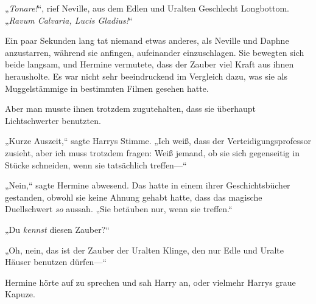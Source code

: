 „\emph{Tonare!}“, rief Neville, aus dem Edlen und Uralten Geschlecht Longbottom. „\emph{Ravum Calvaria, Lucis Gladius!}“

\later

Ein paar Sekunden lang tat niemand etwas anderes, als Neville und Daphne anzustarren, während sie anfingen, aufeinander einzuschlagen. Sie bewegten sich beide langsam, und Hermine vermutete, dass der Zauber viel Kraft aus ihnen herausholte. Es war nicht sehr beeindruckend im Vergleich dazu, was sie als Muggelstämmige in bestimmten Filmen gesehen hatte.

Aber man musste ihnen trotzdem zugutehalten, dass sie überhaupt Lichtschwerter benutzten.

„Kurze Auszeit,“ sagte Harrys Stimme. „Ich weiß, dass der Verteidigungsprofessor zusieht, aber ich muss trotzdem fragen: Weiß jemand, ob sie sich gegenseitig in Stücke schneiden, wenn sie tatsächlich treffen—“

„Nein,“ sagte Hermine abwesend. Das hatte in einem ihrer Geschichtsbücher gestanden, obwohl sie keine Ahnung gehabt hatte, dass das magische Duellschwert \emph{so} aussah. „Sie betäuben nur, wenn sie treffen.“

„Du \emph{kennst} diesen Zauber?“

„Oh, nein, das ist der Zauber der Uralten Klinge, den nur Edle und Uralte Häuser benutzen dürfen—“

Hermine hörte auf zu sprechen und sah Harry an, oder vielmehr Harrys graue Kapuze.

